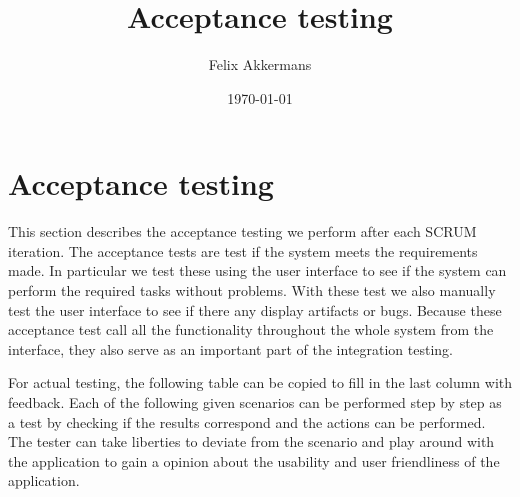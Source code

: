 \documentclass{article}
\begin{document}
\title{Acceptance testing}
\author{Felix Akkermans}
\date{\today}
\maketitle



\section{Acceptance testing}
This section describes the acceptance testing we perform after each SCRUM iteration. The acceptance tests are test if the system meets the requirements made. In particular we test these using the user interface to see if the system can perform the required tasks without problems. With these test we also manually test the user interface to see if there any display artifacts or bugs. Because these acceptance test call all the functionality throughout the whole system from the interface, they also serve as an important part of the integration testing.

For actual testing, the following table can be copied to fill in the last column with feedback. Each of the following given scenarios can be performed step by step as a test by checking if the results correspond and the actions can be performed. The tester can take liberties to deviate from the scenario and play around with the application to gain a opinion about the usability and user friendliness of the application.
\end{document}
